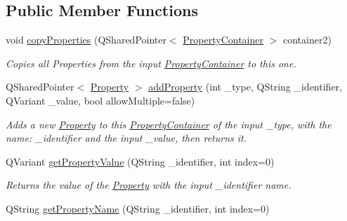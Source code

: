 \subsection*{Public Member Functions}
\begin{DoxyCompactItemize}
\item 
void \hyperlink{class_picto_1_1_property_container_af2850e3e70ac5c5bd7b10ef4d380fa63}{copy\-Properties} (Q\-Shared\-Pointer$<$ \hyperlink{class_picto_1_1_property_container}{Property\-Container} $>$ container2)
\begin{DoxyCompactList}\small\item\em Copies all Properties from the input \hyperlink{class_picto_1_1_property_container}{Property\-Container} to this one. \end{DoxyCompactList}\item 
Q\-Shared\-Pointer$<$ \hyperlink{class_picto_1_1_property}{Property} $>$ \hyperlink{class_picto_1_1_property_container_af755b156820780131812523d562daa82}{add\-Property} (int \-\_\-type, Q\-String \-\_\-identifier, Q\-Variant \-\_\-value, bool allow\-Multiple=false)
\begin{DoxyCompactList}\small\item\em Adds a new \hyperlink{class_picto_1_1_property}{Property} to this \hyperlink{class_picto_1_1_property_container}{Property\-Container} of the input \-\_\-type, with the name\-: \-\_\-identifier and the input \-\_\-value, then returns it. \end{DoxyCompactList}\item 
Q\-Variant \hyperlink{class_picto_1_1_property_container_a6b4c5e9e527156666eb9c39534d5c8e9}{get\-Property\-Value} (Q\-String \-\_\-identifier, int index=0)
\begin{DoxyCompactList}\small\item\em Returns the value of the \hyperlink{class_picto_1_1_property}{Property} with the input \-\_\-identifier name. \end{DoxyCompactList}\item 
\hypertarget{class_picto_1_1_property_container_ad92483d88f45fd4e83b3bf1af4927050}{Q\-String \hyperlink{class_picto_1_1_property_container_ad92483d88f45fd4e83b3bf1af4927050}{get\-Property\-Name} (Q\-String \-\_\-identifier, int index=0)}\label{class_picto_1_1_property_container_ad92483d88f45fd4e83b3bf1af4927050}


\end{DoxyCompactItemize}
